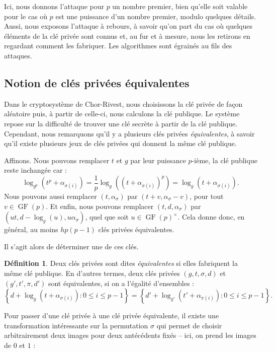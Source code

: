 \documentclass[a4paper, titlepage, 11pt]{article}
\theoremstyle{definition}
\newtheorem{defi}[theo]{Définition}
\theoremstyle{remark}
\def\gf{\operatorname{GF}}
\begin{document}
Ici, nous donnons l'attaque pour $p$ un nombre premier, bien qu'elle soit valable pour le cas où $p$ est une puissance d'un nombre premier, modulo quelques détails. Aussi, nous exposons l'attaque à rebours, à savoir qu'on part du cas où quelques éléments de la clé privée sont connus et, au fur et à mesure, nous les retirons en regardant comment les fabriquer. Les algorithmes sont égrainés au fils des attaques.

\subsection{Notion de clés privées équivalentes}

Dans le cryptosystème de Chor-Rivest, nous choisissons la clé privée de façon aléatoire puis, à partir de celle-ci, nous calculons la clé publique. Le système repose sur la difficulté de trouver une clé secrète à partir de la clé publique. Cependant, nous remarquons qu'il y a plusieurs clés privées \textit{équivalentes}, à savoir qu'il existe plusieurs jeux de clés privées qui donnent la même clé publique.

Affinons. Nous pouvons remplacer $t$ et $g$ par leur puissance $p$-ième, la clé publique reste inchangée car :
$$\log_{g^p}\left(t^p + \alpha_{\sigma(i)}\right) = \frac{1}{p}\log_{g}\left(\left(t + \alpha_{\sigma(i)}\right)^p\right) = \log_{g}\left(t + \alpha_{\sigma(i)}\right).$$
Nous pouvons aussi remplacer $(t, \alpha_{\sigma})$ par $(t + v, \alpha_{\sigma} - v)$, pour tout $v \in \gf(p)$. Et enfin, nous pouvons remplacer $(t,d,\alpha_\sigma)$ par $(ut, d - \log_g(u), u\alpha_\sigma)$, quel que soit $u \in \gf(p)^\times$.
Cela donne donc, en général, au moins $hp(p-1)$ clés privées équivalentes. 

Il s'agit alors de déterminer une de ces clés.


\begin{defi}
Deux clés privées sont dites \textit{équivalentes} si elles fabriquent la même clé publique. En d'autres termes, deux clés privées $(g,t,\sigma,d)$ et $(g',t',\pi ,d')$ sont équivalentes, si on a l'égalité d'ensembles :
$$\left\{d + \log_g(t + \alpha_{\sigma(i)}) : 0\leqslant i \leqslant p-1\right\} = \left\{d' + \log_{g'}(t' + \alpha_{\pi(i)}) : 0\leqslant i \leqslant p-1\right\}.$$
\end{defi}

Pour passer d'une clé privée à une clé privée équivalente, il existe une transformation intéressante sur la permutation $\sigma$ qui permet de choisir arbitrairement deux images pour deux antécédents fixés -- ici, on prend les images de $0$ et $1$ :
\end{document}
